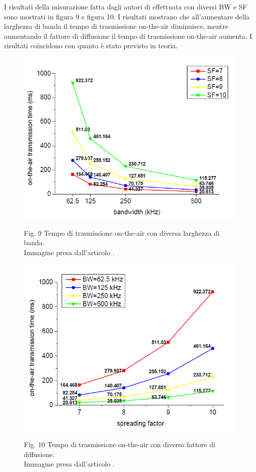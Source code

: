 \documentclass[a4paper]{report} %
\begin{document}
I risultati della misurazione fatta dagli autori di \cite{art:rif.44} effettuata con diversi BW e SF sono mostrati in figura 9 e figura 10. I risultati mostrano che all'aumentare della larghezza di banda il tempo di trasmissione on-the-air diminuisce, mentre aumentando il fattore di diffusione il tempo di trasmissione on-the-air aumenta. I risultati coincidono con quanto è stato previsto in teoria.
\begin{figure}
	\centering
	\includegraphics[scale=.5]{Immagini/r1.png}
	
	Fig. 9 Tempo di trasmissione on-the-air con diversa larghezza di banda.\\
	Immagine presa dall'articolo \cite{art:rif.44}.
\end{figure}

\begin{figure}
	\centering
	\includegraphics[scale=.5]{Immagini/r2.png}
	
	Fig. 10 Tempo di trasmissione on-the-air con diverso fattore di diffusione.\\
	Immagine presa dall'articolo \cite{art:rif.44}.
\end{figure}
\end{document}
